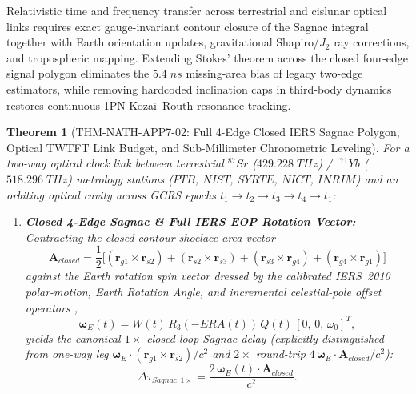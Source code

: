 \documentclass[11pt,a4paper,reqno]{article}
\def\texttt#1{#1}%
\def\mathrm#1{#1}%
\theoremstyle{plain}
\newtheorem{theorem}{Theorem}[section]
\theoremstyle{definition}
\theoremstyle{remark}
\numberwithin{equation}{section}
\numberwithin{table}{section}
\begin{document}
Relativistic time and frequency transfer across terrestrial and cislunar optical links requires exact gauge-invariant contour closure of the Sagnac integral together with Earth orientation updates, gravitational Shapiro/$J_2$ ray corrections, and tropospheric mapping. Extending Stokes' theorem across the closed four-edge signal polygon eliminates the $5.4\;\mathrm{ns}$ missing-area bias of legacy two-edge estimators, while removing hardcoded inclination caps in third-body dynamics restores continuous 1PN Kozai--Routh resonance tracking.

\begin{theorem}[{\texttt{THM-NATH-APP7-02}: Full 4-Edge Closed IERS Sagnac Polygon, Optical TWTFT Link Budget, and Sub-Millimeter Chronometric Leveling}]
\label{thm:nath_sagnac_twtft}
For a two-way optical clock link between terrestrial $^{87}\mathrm{Sr}$ ($429.228\;\mathrm{THz}$) / $^{171}\mathrm{Yb}$ ($518.296\;\mathrm{THz}$) metrology stations ($\mathrm{PTB}$, $\mathrm{NIST}$, $\mathrm{SYRTE}$, $\mathrm{NICT}$, $\mathrm{INRIM}$) and an orbiting optical cavity across GCRS epochs $t_1 \to t_2 \to t_3 \to t_4 \to t_1$:
\begin{enumerate}[label=(\roman*)]
  \item \textbf{Closed 4-Edge Sagnac \& Full IERS EOP Rotation Vector:} Contracting the closed-contour shoelace area vector
  \begin{equation}
    \mathbf{A}_{\mathrm{closed}} = \frac{1}{2}\Big[
      (\mathbf{r}_{g1}\times\mathbf{r}_{s2})
    + (\mathbf{r}_{s2}\times\mathbf{r}_{s3})
    + (\mathbf{r}_{s3}\times\mathbf{r}_{g4})
    + (\mathbf{r}_{g4}\times\mathbf{r}_{g1})
    \Big]
    \label{eq:sagnac_4edge}
  \end{equation}
  against the Earth rotation spin vector dressed by the calibrated IERS~2010 polar-motion, Earth Rotation Angle, and incremental celestial-pole offset operators \cite{IERS2010},
  \begin{equation}
    \boldsymbol{\omega}_E(t) = W(t)\, R_3(-\mathrm{ERA}(t))\, Q(t)\,[0,\,0,\,\omega_0]^T,
    \label{eq:iers_spin_vec}
  \end{equation}
  yields the canonical $1\times$ closed-loop Sagnac delay (explicitly distinguished from one-way leg $\boldsymbol{\omega}_E\cdot(\mathbf{r}_{g1}\times\mathbf{r}_{s2})/c^2$ and $2\times$ round-trip $4\,\boldsymbol{\omega}_E\cdot\mathbf{A}_{\mathrm{closed}}/c^2$):
  \begin{equation}
    \Delta\tau_{\mathrm{Sagnac},1\times} = \frac{2\,\boldsymbol{\omega}_E(t)\cdot\mathbf{A}_{\mathrm{closed}}}{c^2}.

\end{equation}
\end{enumerate}
\end{theorem}
\end{document}
